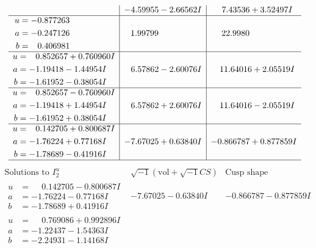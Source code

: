 \documentclass[1p]{elsarticle_modified}
\theoremstyle{definition}
\newcommand{\I}{\sqrt{-1}}
\begin{document}
$$\begin{array}{c|c|c}
 & -4.59955 - 2.66562 I & \phantom{-}7.43536 + 3.52497 I \\ \hline\begin{aligned}
u &= -0.877263\phantom{ +0.000000I} \\
a &= -0.247126\phantom{ +0.000000I} \\
b &= \phantom{-}0.406981\phantom{ +0.000000I}\end{aligned}
 & \phantom{-}1.99799\phantom{ +0.000000I} & \phantom{-}22.9980\phantom{ +0.000000I} \\ \hline\begin{aligned}
u &= \phantom{-}0.852657 + 0.760960 I \\
a &= -1.19418 - 1.44954 I \\
b &= -1.61952 - 0.38054 I\end{aligned}
 & \phantom{-}6.57862 - 2.60076 I & \phantom{-}11.64016 + 2.05519 I \\ \hline\begin{aligned}
u &= \phantom{-}0.852657 - 0.760960 I \\
a &= -1.19418 + 1.44954 I \\
b &= -1.61952 + 0.38054 I\end{aligned}
 & \phantom{-}6.57862 + 2.60076 I & \phantom{-}11.64016 - 2.05519 I \\ \hline\begin{aligned}
u &= \phantom{-}0.142705 + 0.800687 I \\
a &= -1.76224 + 0.77168 I \\
b &= -1.78689 - 0.41916 I\end{aligned}
 & -7.67025 + 0.63840 I & -0.866787 + 0.877859 I\\
 \hline 
 \end{array}$$\newpage$$\begin{array}{c|c|c}  
\text{Solutions to }I^u_{2}& \I (\text{vol} + \sqrt{-1}CS) & \text{Cusp shape}\\
 \hline 
\begin{aligned}
u &= \phantom{-}0.142705 - 0.800687 I \\
a &= -1.76224 - 0.77168 I \\
b &= -1.78689 + 0.41916 I\end{aligned}
 & -7.67025 - 0.63840 I & -0.866787 - 0.877859 I \\ \hline\begin{aligned}
u &= \phantom{-}0.769086 + 0.992896 I \\
a &= -1.22437 - 1.54363 I \\
b &= -2.24931 - 1.14168 I\end{aligned}

\end{array}$$
\end{document}
